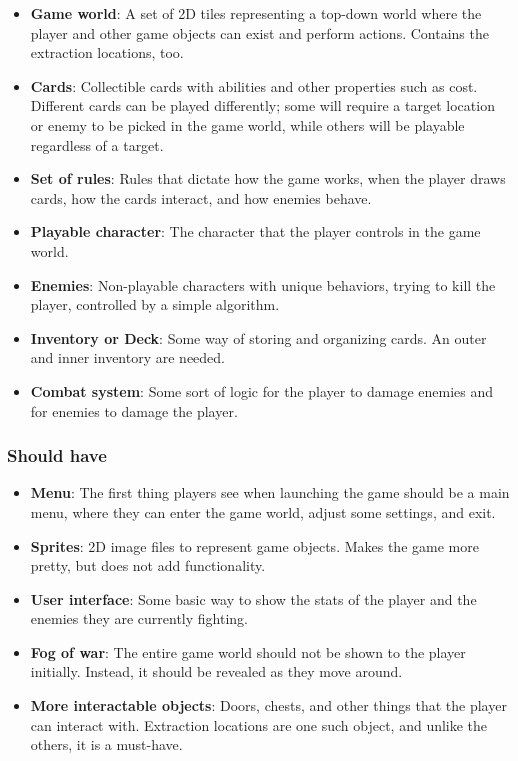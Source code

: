\begin{itemize}
    \item \textbf{Game world}: A set of 2D tiles representing a top-down world where the player and other game objects can exist and perform actions. Contains the extraction locations, too.
    \item \textbf{Cards}: Collectible cards with abilities and other properties such as cost. Different cards can be played differently; some will require a target location or enemy to be picked in the game world, while others will be playable regardless of a target. 
    \item \textbf{Set of rules}: Rules that dictate how the game works, when the player draws cards, how the cards interact, and how enemies behave.
    \item \textbf{Playable character}: The character that the player controls in the game world.
    \item \textbf{Enemies}: Non-playable characters with unique behaviors, trying to kill the player, controlled by a simple algorithm.
    \item \textbf{Inventory or Deck}: Some way of storing and organizing cards. An outer and inner inventory are needed.
    \item \textbf{Combat system}: Some sort of logic for the player to damage enemies and for enemies to damage the player.
\end{itemize}

\subsubsection{Should have}

\begin{itemize}
    \item \textbf{Menu}: The first thing players see when launching the game should be a main menu, where they can enter the game world, adjust some settings, and exit.
    \item \textbf{Sprites}: 2D image files to represent game objects. Makes the game more pretty, but does not add functionality.
    \item \textbf{User interface}: Some basic way to show the stats of the player and the enemies they are currently fighting. 
    \item \textbf{Fog of war}: The entire game world should not be shown to the player initially. Instead, it should be revealed as they move around.
    \item \textbf{More interactable objects}: Doors, chests, and other things that the player can interact with. Extraction locations are one such object, and unlike the others, it is a must-have.
\end{itemize}

